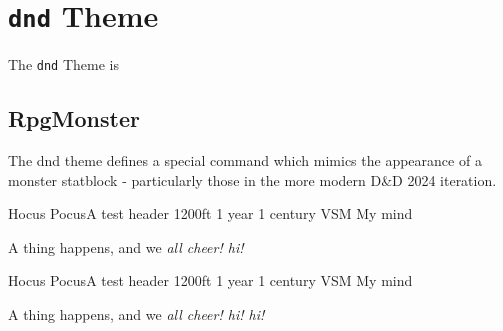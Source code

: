 \chapter{\texttt{dnd} Theme}

	The \texttt{dnd} Theme is 

	\section{RpgMonster}

		The dnd theme defines a special command which mimics the appearance of a monster statblock - particularly those in the more modern D\&D 2024 iteration. 

			


	\begin{RpgSpell}{Hocus Pocus}{A test header}
			{1200ft}
			{1 year}
			{1 century}
			{VSM}
			{My mind}

			A thing happens, and we \it all cheer! \blindtext \cardbreak hi! \cardbreak
		\end{RpgSpell}
		\begin{RpgSpell}{Hocus Pocus}{A test header}
			{1200ft}
			{1 year}
			{1 century}
			{VSM}
			{My mind}

			A thing happens, and we \it all cheer! \blindtext \cardbreak hi! \cardbreak hi!
		\end{RpgSpell}


		\begin{RpgCard}[]{}
			\Blindtext
		\end{RpgCard}







	
